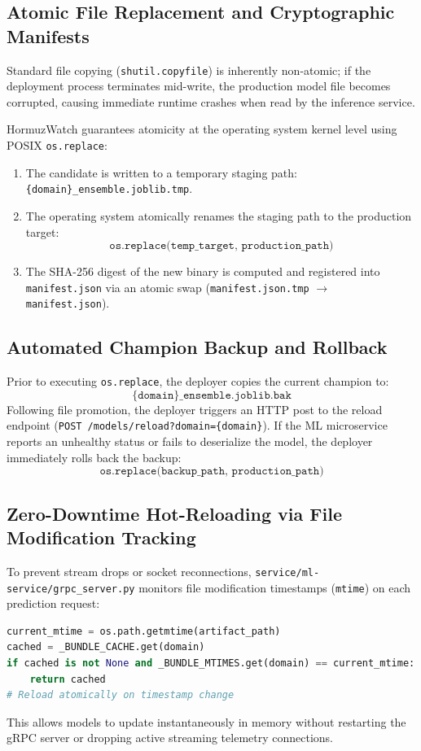 \subsection{Atomic File Replacement and Cryptographic Manifests}
Standard file copying (\texttt{shutil.copyfile}) is inherently non-atomic; if the deployment process terminates mid-write, the production model file becomes corrupted, causing immediate runtime crashes when read by the inference service.

HormuzWatch guarantees atomicity at the operating system kernel level using POSIX \texttt{os.replace}:
\begin{enumerate}[leftmargin=*]
    \item The candidate is written to a temporary staging path: \texttt{\{domain\}\_ensemble.joblib.tmp}.
    \item The operating system atomically renames the staging path to the production target:
    \begin{equation}
    \texttt{os.replace(temp\_target, production\_path)}
    \end{equation}
    \item The SHA-256 digest of the new binary is computed and registered into \texttt{manifest.json} via an atomic swap (\texttt{manifest.json.tmp} $\to$ \texttt{manifest.json}).
\end{enumerate}

\subsection{Automated Champion Backup and Rollback}
Prior to executing \texttt{os.replace}, the deployer copies the current champion to:
\begin{equation}
\texttt{\{domain\}\_ensemble.joblib.bak}
\end{equation}
Following file promotion, the deployer triggers an HTTP post to the reload endpoint (\texttt{POST /models/reload?domain=\{domain\}}). If the ML microservice reports an unhealthy status or fails to deserialize the model, the deployer immediately rolls back the backup:
\begin{equation}
\texttt{os.replace(backup\_path, production\_path)}
\end{equation}

\subsection{Zero-Downtime Hot-Reloading via File Modification Tracking}
To prevent stream drops or socket reconnections, \texttt{service/ml-service/grpc\_server.py} monitors file modification timestamps (\texttt{mtime}) on each prediction request:
\begin{lstlisting}[language=Python, basicstyle=\small\ttfamily]
current_mtime = os.path.getmtime(artifact_path)
cached = _BUNDLE_CACHE.get(domain)
if cached is not None and _BUNDLE_MTIMES.get(domain) == current_mtime:
    return cached
# Reload atomically on timestamp change
\end{lstlisting}
This allows models to update instantaneously in memory without restarting the gRPC server or dropping active streaming telemetry connections.

